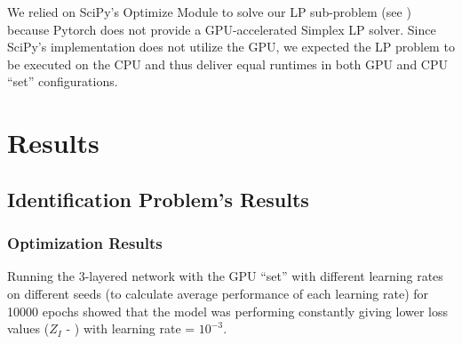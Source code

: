 \documentclass[12pt]{article}
\begin{document}
    We relied on SciPy's Optimize Module to solve our LP sub-problem (see ) because Pytorch does not provide a GPU-accelerated Simplex LP solver. Since SciPy's implementation does not utilize the GPU, we expected the LP problem to be executed on the CPU and thus deliver equal runtimes in both GPU and CPU ``set'' configurations.
    
    \section{Results} \label{sec:Results}
    \subsection{Identification Problem's Results} \label{sec:Identification Problem's Results}
    \subsubsection{Optimization Results} \label{sec:IdProbRes - Optimization}
    Running the 3-layered network with the GPU ``set'' with different learning rates on different seeds (to calculate average performance of each learning rate) for 10000 epochs showed that the model was performing constantly giving lower loss values ($Z_I$ - ) with learning rate = $10^{-3}$. 
    
\end{document}
